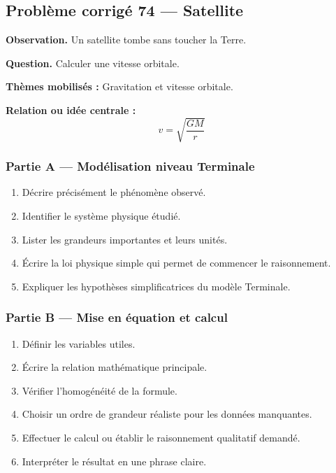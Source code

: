 \documentclass[11pt,a4paper]{article}
\begin{document}
\subsection{Problème corrigé 74 — Satellite}

\begin{exercicebox}
\textbf{Observation.} Un satellite tombe sans toucher la Terre.

\medskip
\textbf{Question.} Calculer une vitesse orbitale.

\medskip
\textbf{Thèmes mobilisés :} Gravitation et vitesse orbitale.

\medskip
\textbf{Relation ou idée centrale :}
\[
v=\sqrt{\frac{GM}{r}}
\]
\end{exercicebox}

\subsubsection*{Partie A — Modélisation niveau Terminale}

\begin{enumerate}
  \item Décrire précisément le phénomène observé.
  \item Identifier le système physique étudié.
  \item Lister les grandeurs importantes et leurs unités.
  \item Écrire la loi physique simple qui permet de commencer le raisonnement.
  \item Expliquer les hypothèses simplificatrices du modèle Terminale.
\end{enumerate}

\subsubsection*{Partie B — Mise en équation et calcul}

\begin{enumerate}
  \item Définir les variables utiles.
  \item Écrire la relation mathématique principale.
  \item Vérifier l'homogénéité de la formule.
  \item Choisir un ordre de grandeur réaliste pour les données manquantes.
  \item Effectuer le calcul ou établir le raisonnement qualitatif demandé.
  \item Interpréter le résultat en une phrase claire.
\end{enumerate}
\end{document}
